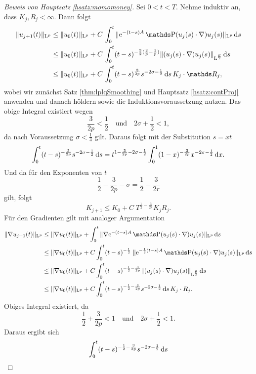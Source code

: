 \begin{proof}[Beweis von Hauptsatz \ref{hsatz:momomoney}]
  Sei $0 < t < T$. 
  Nehme induktiv an, dass $K_j, R_j < \infty$.
  Dann folgt
  \begin{align*}
    \|u_{j + 1}(t) \|_{\Ell^p}
    &\leq \|u_0(t)\|_{\Ell^p} + C \, \int_0^t \|\e^{-(t - s) A} \PP(u_j(s) \cdot \nabla) u_j(s) \|_{\Ell^p} \d s \\
    &\leq \|u_0(t)\|_{\Ell^p} + C \, \int_0^t (t - s)^{-\frac{3}{2} (\frac{2}{p} - \frac{1}{p})} \|(u_j(s) \cdot \nabla) u_j(s) \|_{\Ell^{\frac{p}{2}}} \d s \\
    &\leq \|u_0(t)\|_{\Ell^p} + C \, \int_0^t (t - s)^{\frac{3}{2p}} s^{-2\sigma - \frac{1}{2}} \d s \, K_j \cdot \R_j,
  \end{align*}
  wobei wir zunächst Satz \ref{thm:lplqSmoothing} und Hauptsatz \ref{hsatz:contProj} anwenden und danach höldern sowie die Induktionsvoraussetzung nutzen.
  Das obige Integral existiert wegen
  $$
  \frac{3}{2p} < \frac{1}{2} \quad\text{und}\quad 2\sigma + \frac{1}{2} < 1,
  $$
  da nach Voraussetzung $\sigma < \frac{1}{4}$ gilt.
  Daraus folgt mit der Substitution $s = xt$
  $$
  \int_0^t (t - s)^{-\frac{3}{2p}} s^{-2\sigma - \frac{1}{2}} \, {\operatorname{d}\!{s}} = t^{1 - \frac{3}{2p} - 2\sigma - \frac{1}{2}} \int_0^1 ( 1 - x )^{-\frac{3}{2p}}  x^{- 2\sigma - \frac{1}{2}} \, {\operatorname{d}\!{x}}.
  $$
  Und da für den Exponenten von $t$
  $$
  \frac{1}{2} - \frac{3}{2p} - \sigma = \frac{1}{2} - \frac{3}{2r}
  $$
  gilt, folgt
  $$
  K_{j + 1} \leq K_0 + C\; T^{\frac{1}{2} - \frac{3}{2r}} K_j R_j.
  $$
  Für den Gradienten gilt mit analoger Argumentation
  \begin{align*}
    \|\nabla u_{j + 1}(t) \|_{\Ell^p}
    &\leq \|\nabla u_0 (t) \|_{\Ell^p} + \int_0^t \|\nabla \e^{-(t - s) A} \PP(u_j(s) \cdot \nabla) u_j(s) \|_{\Ell^p} \d s \\
    &\leq \|\nabla u_0(t) \|_{\Ell^p} + C \int_0^t (t - s)^{-\frac{1}{2}} \; \|\e^{-\frac{1}{2}(t - s)A} \PP(u_j(s) \cdot \nabla) u_j(s) \|_{\Ell^p} \d s \\
    &\leq \|\nabla u_0(t) \|_{\Ell^p} + C \int_0^t (t - s)^{-\frac{1}{2} - \frac{3}{2p}} \|(u_j(s) \cdot \nabla) u_j(s) \|_{\Ell^{\frac{p}{2}}} \d s \\ 
    &\leq \|\nabla u_0(t) \|_{\Ell^p} + C \int_0^t (t - s)^{-\frac{1}{2} - \frac{3}{2p}} s^{-2\sigma - \frac{1}{2}} \d s \, K_j \cdot R_j.
  \end{align*}
  Obiges Integral existiert, da
  $$
  \frac{1}{2} + \frac{3}{2p} < 1 \quad\text{und}\quad 2\sigma + \frac{1}{2} < 1.
  $$
  Daraus ergibt sich
  $$
  \int_0^t (t - s)^{-\frac{1}{2} - \frac{3}{2p}} s^{-2\sigma - \frac{1}{2}} \, {\operatorname{d}\!{s}} 
$$
\end{proof}
